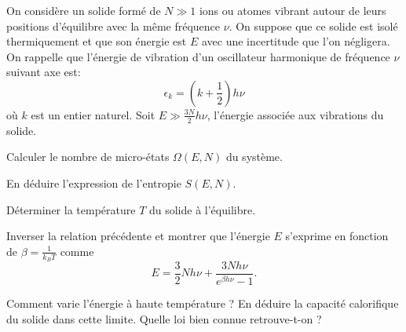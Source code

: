 On considère un solide formé de $N \gg 1$ ions ou atomes vibrant autour de leurs positions d'équilibre avec la même fréquence $\nu$. On suppose que ce solide est isolé thermiquement et que son énergie est $E$ avec une incertitude que l'on négligera. On rappelle que l'énergie de vibration d'un oscillateur harmonique de fréquence $\nu$ suivant  axe est:
$$
\epsilon_k=(k+\frac{1}{2}) h \nu
$$
où $k$ est un entier naturel. Soit $E \gg \frac{3N}{2} h \nu$, l'énergie associée aux vibrations du solide.

\question
Calculer le nombre de micro-états $\Omega(E,N)$ du système.

\question
En déduire l'expression de l'entropie $S(E,N)$.

\question
Déterminer la température $T$ du solide à l'équilibre. 

\question
Inverser la relation précédente et montrer que l'énergie $E$ s'exprime en fonction de $\beta=\frac{1}{k_BT}$ comme
$$
E=\frac{3}{2} N h \nu + \frac{3Nh \nu}{e^{\beta h \nu}-1}. \nonumber
$$

\question
Comment varie l'énergie à haute température ? En déduire la capacité calorifique du solide dans cette limite. Quelle loi bien connue retrouve-t-on ?
